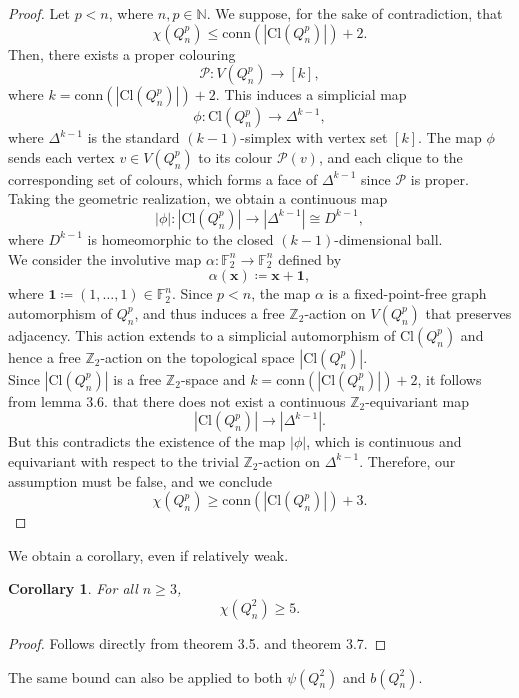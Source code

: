 \documentclass[12pt]{amsart}
\numberwithin{figure}{section}
\theoremstyle{plain}
\newtheorem{corollary}[theorem]{Corollary}
\begin{document}
\begin{proof}
    Let $p<n$, where $n,p \in\mathbb{N}$. We suppose, for the sake of contradiction, that
    \[\chi(Q_{n}^{p}) \leq \mathrm{conn}(|\mathrm{Cl}(Q_{n}^{p})|) + 2.\]
    Then, there exists a proper colouring
    \[\mathcal{P} : V(Q_{n}^{p}) \to [k],\]
    where $k = \mathrm{conn}(|\mathrm{Cl}(Q_{n}^{p})|) + 2$.
    This induces a simplicial map
    \[\phi : \mathrm{Cl}(Q_{n}^{p}) \to \Delta^{k-1},\]
    where $\Delta^{k-1}$ is the standard $(k-1)$-simplex with vertex set $[k]$. The map $\phi$ sends each vertex $v\in V(Q_{n}^{p})$ to its colour $\mathcal{P}(v)$, and each clique to the corresponding set of colours, which forms a face of $\Delta^{k-1}$ since $\mathcal{P}$ is proper. Taking the geometric realization, we obtain a continuous map
    \[|\phi| : |\mathrm{Cl}(Q_{n}^{p})| \to |\Delta^{k-1}| \cong D^{k-1},\]
    where $D^{k-1}$ is homeomorphic to the closed $(k-1)$-dimensional ball.\\
    \indent We consider the involutive map $\alpha : \mathbb{F}_{2}^{n} \to \mathbb{F}_{2}^{n}$ defined by
    \[\alpha(\mathbf{x}) \coloneq \mathbf{x} + \mathbf{1},\]
    where $\mathbf{1} \coloneq (1,\dots,1) \in \mathbb{F}_{2}^{n}$. Since $p < n$, the map $\alpha$ is a fixed-point-free graph automorphism of $Q_{n}^{p}$, and thus induces a free $\mathbb{Z}_{2}$-action on $V(Q_{n}^{p})$ that preserves adjacency. This action extends to a simplicial automorphism of $\mathrm{Cl}(Q_{n}^{p})$ and hence a free $\mathbb{Z}_{2}$-action on the topological space $|\mathrm{Cl}(Q_{n}^{p})|$.\\
    \indent Since $|\mathrm{Cl}(Q_{n}^{p})|$ is a free $\mathbb{Z}_{2}$-space and $k = \mathrm{conn}(|\mathrm{Cl}(Q_{n}^{p})|) + 2$, it follows from lemma 3.6. that there does not exist a continuous $\mathbb{Z}_{2}$-equivariant map
    \[|\mathrm{Cl}(Q_{n}^{p})| \to |\Delta^{k-1}|.\]
    But this contradicts the existence of the map $|\phi|$, which is continuous and equivariant with respect to the trivial $\mathbb{Z}_{2}$-action on $\Delta^{k-1}$. Therefore, our assumption must be false, and we conclude
    \[\chi(Q_{n}^{p}) \geq \mathrm{conn}(|\mathrm{Cl}(Q_{n}^{p})|) + 3.\]
\end{proof}
\indent We obtain a corollary, even if relatively weak.
\begin{corollary}
    For all $n\geq 3$,
    \[\chi(Q_{n}^{2}) \geq 5.\]
\end{corollary}
\begin{proof}
    Follows directly from theorem 3.5. and theorem 3.7.
\end{proof}
\indent The same bound can also be applied to both $\psi(Q_{n}^{2})$ and $b(Q_{n}^{2})$.
\end{document}
